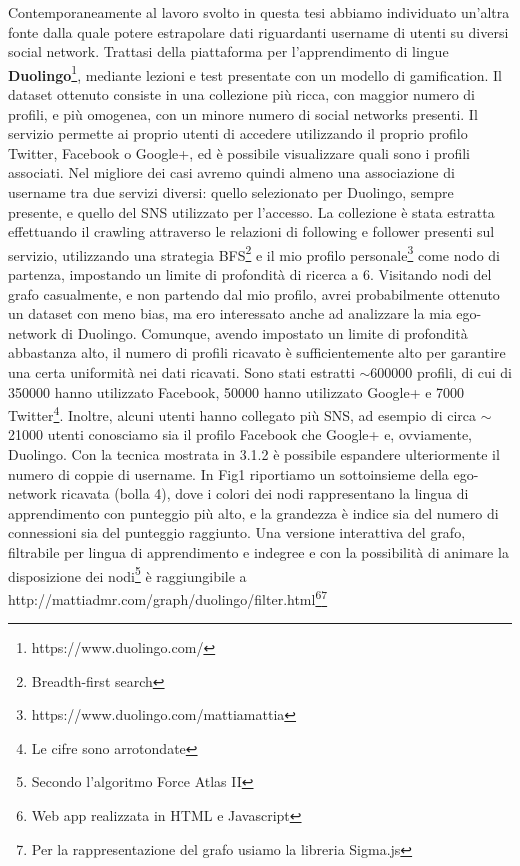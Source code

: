 Contemporaneamente al lavoro svolto in questa tesi abbiamo individuato un'altra fonte dalla quale potere estrapolare dati riguardanti username di utenti su diversi social network. Trattasi della piattaforma per l'apprendimento di lingue \textbf{Duolingo}\footnote{https://www.duolingo.com/}, mediante lezioni e test presentate con un modello di gamification. Il dataset ottenuto consiste in una collezione più ricca, con maggior numero di profili, e più omogenea, con un minore numero di social networks presenti. Il servizio permette ai proprio utenti di accedere utilizzando il proprio profilo Twitter, Facebook o Google+, ed è possibile visualizzare quali sono i profili associati. Nel migliore dei casi avremo quindi almeno una associazione di username tra due servizi diversi: quello selezionato per Duolingo, sempre presente, e quello del SNS utilizzato per l'accesso. La collezione è stata estratta effettuando il crawling attraverso le relazioni di following e follower presenti sul servizio, utilizzando una strategia BFS\footnote{Breadth-first search} e il mio profilo personale\footnote{https://www.duolingo.com/mattiamattia} come nodo di partenza, impostando un limite di profondità di ricerca a 6. Visitando nodi del grafo casualmente, e non partendo dal mio profilo, avrei probabilmente ottenuto un dataset con meno bias, ma ero interessato anche ad analizzare la mia ego-network di Duolingo. Comunque, avendo impostato un limite di profondità abbastanza alto, il numero di profili ricavato è sufficientemente alto per garantire una certa uniformità nei dati ricavati. Sono stati estratti $\sim$600000 profili, di cui di 350000 hanno utilizzato Facebook, 50000 hanno utilizzato Google+ e 7000 Twitter\footnote{Le cifre sono arrotondate}. Inoltre, alcuni utenti hanno collegato più SNS, ad esempio di circa $\sim$21000 utenti conosciamo sia il profilo Facebook che Google+ e, ovviamente, Duolingo. Con la tecnica mostrata in 3.1.2 è possibile espandere ulteriormente il numero di coppie di username. In Fig1 riportiamo un sottoinsieme della ego-network ricavata (bolla 4), dove i colori dei nodi rappresentano la lingua di apprendimento con punteggio più alto, e la grandezza è indice sia del numero di connessioni sia del punteggio raggiunto. Una versione interattiva del grafo, filtrabile per lingua di apprendimento e indegree e con la possibilità di animare la disposizione dei nodi\footnote{Secondo l'algoritmo Force Atlas II} è raggiungibile a http://mattiadmr.com/graph/duolingo/filter.html\footnote{Web app realizzata in HTML e Javascript}\footnote{Per la rappresentazione del grafo usiamo la libreria Sigma.js}

